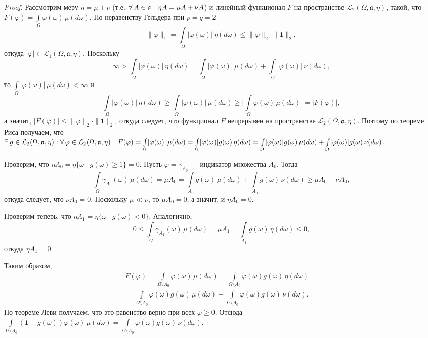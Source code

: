 \documentclass[12pt,titlepage]{article}
\theoremstyle{definition}
\newcommand*{\p}[1]{#1\nobreak\discretionary{}{\hbox{$\mathsurround=0pt #1$}}{}}
\begin{document}
\begin{proof}
Рассмотрим меру $\eta=\mu+\nu$ (т.е.
$\forall\,A\in\mathfrak{a}\quad\eta A=\mu A\p+\nu A$) и линейный
функционал $F$ на пространстве
$\mathcal{L}_2(\Omega,\mathfrak{a},\eta)$, такой, что
$F(\varphi)=\int\limits_\Omega\!\varphi(\omega)\,\mu(d\omega)$. По
неравенству Гельдера при $p=q=2$
$$\|\varphi\|_1=\int\limits_\Omega\!|\varphi(\omega)|\,\eta(d\omega)\leqslant
\|\varphi\|_2\cdot\|\mathbf{1}\|_2,$$ откуда
$|\varphi|\in\mathcal{L}_1(\Omega,\mathfrak{a},\eta)$. Поскольку
$$\infty>\int\limits_\Omega\!|\varphi(\omega)|\,\eta(d\omega)=
\int\limits_\Omega\!|\varphi(\omega)|\,\mu(d\omega)+\int\limits_\Omega\!|\varphi(\omega)|\,\nu(d\omega),$$
то $\int\limits_\Omega\!|\varphi(\omega)|\,\mu(d\omega)<\infty$ и
$$\int\limits_\Omega\!|\varphi(\omega)|\,\eta(d\omega)\geqslant
\int\limits_\Omega\!|\varphi(\omega)|\,\mu(d\omega)\geqslant
\Big|\int\limits_\Omega\!\varphi(\omega)\,\mu(d\omega)\Big|=|F(\varphi)|,$$
а значит, $|F(\varphi)|\leqslant\|\varphi\|_2\cdot\|\mathbf{1}\|_2$,
откуда следует, что функционал $F$ непрерывен на пространстве
$\mathcal{L}_2(\Omega,\mathfrak{a},\eta)$. Поэтому по теореме Риса
получаем, что $\exists\,g\in\mathcal{L}_2(\Omega,\mathfrak{a},\eta):
\forall\,\varphi\in\mathcal{L}_2(\Omega,\mathfrak{a},\eta)\quad
F(\varphi)=\int\limits_\Omega\!|\varphi(\omega)|\,\mu(d\omega)\p=
\int\limits_\Omega\!|\varphi(\omega)|g(\omega)\,\eta(d\omega)=
\int\limits_\Omega\!|\varphi(\omega)|g(\omega)\,\mu(d\omega)+
\int\limits_\Omega\!|\varphi(\omega)|g(\omega)\,\nu(d\omega)$.

Проверим, что $\eta A_0=\eta\{\omega\mid g(\omega)\geqslant 1\}=0$.
Пусть $\varphi=\gamma_{A_0}$ --- индикатор множества $A_0$. Тогда
$$\int\limits_\Omega\!\gamma_{A_0}(\omega)\,\mu(d\omega)=\mu A_0=
\int\limits_{A_0}\!g(\omega)\,\mu(d\omega)+\int\limits_{A_0}\!g(\omega)\,\nu(d\omega)
\geqslant \mu A_0+\nu A_0,$$ откуда следует, что $\nu A_0=0$.
Поскольку $\mu\ll\nu$, то $\mu A_0=0$, а значит, и $\eta A_0=0$.

Проверим теперь, что $\eta A_1=\eta\{\omega\mid g(\omega)<0\}$.
Аналогично,
$$0\leqslant\int\limits_\Omega\!\gamma_{A_1}(\omega)\,\mu(d\omega)=\mu A_1=
\int\limits_{A_1}\!g(\omega)\,\eta(d\omega)\leqslant 0,$$ откуда
$\eta A_1=0$.

Таким образом,
\begin{multline*}
F(\varphi)=\int\limits_{\Omega\setminus
A_0}\!\varphi(\omega)\,\mu(d\omega)=\int\limits_{\Omega\setminus
A_0}\!\varphi(\omega)g(\omega)\,\eta(d\omega)=\\=\int\limits_{\Omega\setminus
A_0}\!\varphi(\omega)g(\omega)\,\mu(d\omega)+\int\limits_{\Omega\setminus
A_0}\!\varphi(\omega)g(\omega)\,\nu(d\omega).
\end{multline*}
По теореме Леви получаем, что это равенство верно при всех
$\varphi\geqslant 0$. Отсюда $\int\limits_{\Omega\setminus
A_0}\!(\mathbf{1}-g(\omega))\varphi(\omega)\,\mu(d\omega)=\int\limits_{\Omega\setminus
A_0}\!\varphi(\omega)g(\omega)\,\nu(d\omega)$.


\end{proof}
\end{document}
